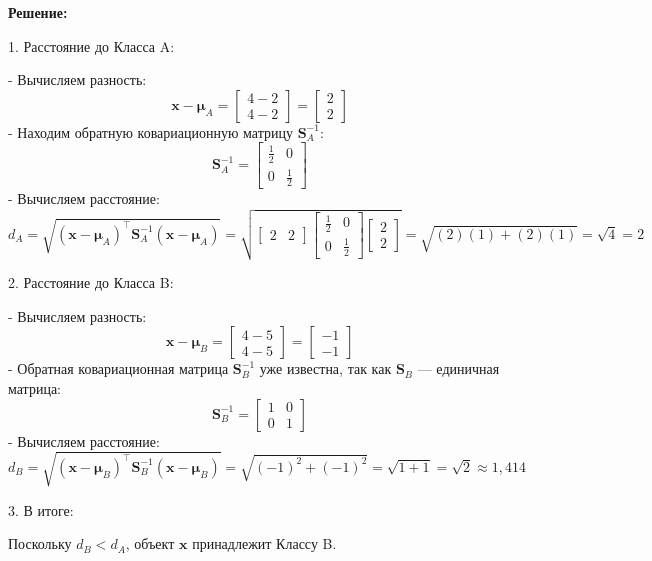 \textbf{Решение:}

1. Расстояние до Класса A:

- Вычисляем разность:
  \[
  \mathbf{x} - \mathbf{\mu}_A = \begin{bmatrix} 4 - 2 \\ 4 - 2 \end{bmatrix} = \begin{bmatrix} 2 \\ 2 \end{bmatrix}
  \]
- Находим обратную ковариационную матрицу \( \mathbf{S}_A^{-1} \):
  \[
  \mathbf{S}_A^{-1} = \begin{bmatrix} \frac{1}{2} & 0 \\ 0 & \frac{1}{2} \end{bmatrix}
  \]
- Вычисляем расстояние:
  \[
  d_A = \sqrt{ (\mathbf{x} - \mathbf{\mu}_A)^\top \mathbf{S}_A^{-1} (\mathbf{x} - \mathbf{\mu}_A) } = \sqrt{ \begin{bmatrix} 2 & 2 \end{bmatrix} \begin{bmatrix} \frac{1}{2} & 0 \\ 0 & \frac{1}{2} \end{bmatrix} \begin{bmatrix} 2 \\ 2 \end{bmatrix} } = \sqrt{ (2)(1) + (2)(1) } = \sqrt{4} = 2
  \]

2. Расстояние до Класса B:

- Вычисляем разность:
  \[
  \mathbf{x} - \mathbf{\mu}_B = \begin{bmatrix} 4 - 5 \\ 4 - 5 \end{bmatrix} = \begin{bmatrix} -1 \\ -1 \end{bmatrix}
  \]
- Обратная ковариационная матрица \( \mathbf{S}_B^{-1} \) уже известна, так как \( \mathbf{S}_B \) — единичная матрица:
  \[
  \mathbf{S}_B^{-1} = \begin{bmatrix} 1 & 0 \\ 0 & 1 \end{bmatrix}
  \]
- Вычисляем расстояние:
  \[
  d_B = \sqrt{ (\mathbf{x} - \mathbf{\mu}_B)^\top \mathbf{S}_B^{-1} (\mathbf{x} - \mathbf{\mu}_B) } = \sqrt{ (-1)^2 + (-1)^2 } = \sqrt{1 + 1} = \sqrt{2} \approx 1{,}414
  \]

3. В итоге:

Поскольку \( d_B < d_A \), объект \( \mathbf{x} \) принадлежит Классу B.



